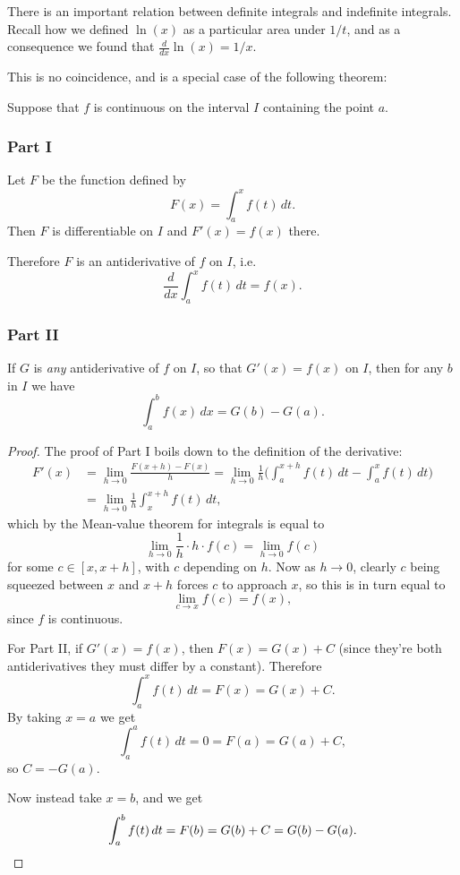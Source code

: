 
There is an important relation between definite integrals and indefinite integrals. Recall how we defined $\ln(x)$ as a particular area under $1/t$, and as a consequence we found that $\frac{d}{d x} \ln(x) = 1/x$.

This is no coincidence, and is a special case of the following theorem:

\begin{theorem}
	Suppose that $f$ is continuous on the interval $I$ containing the point $a$.

	\subsubsection*{Part I}

	Let $F$ be the function defined by
	\[
		F(x) = \int_a^x f(t) \, d t.
	\]
	Then $F$ is differentiable on $I$ and $F'(x) = f(x)$ there.

	Therefore $F$ is an antiderivative of $f$ on $I$, i.e.
	\[
		\frac{d}{d x} \int_a^x f(t) \, d t = f(x).
	\]

	\subsubsection*{Part II}

	If $G$ is \emph{any} antiderivative of $f$ on $I$, so that $G'(x) = f(x)$ on $I$, then for any $b$ in $I$ we have
	\[
		\int_a^b f(x) \, d x = G(b) - G(a).
	\]
\end{theorem}

\begin{proof}
	The proof of Part I boils down to the definition of the derivative:
	\begin{align*}
		F'(x) & = \lim_{h \to 0} \frac{F(x + h) - F(x)}{h} = \lim_{h \to 0} \frac{1}{h} \Big ( \int_a^{x + h} f(t) \, d t - \int_a^x f(t) \, d t \Big ) \\
		      & = \lim_{h \to 0} \frac{1}{h} \int_x^{x + h} f(t) \, d t,
	\end{align*}
	which by the Mean-value theorem for integrals is equal to
	\[
		\lim_{h \to 0} \frac{1}{h} \cdot h \cdot f(c) = \lim_{h \to 0} f(c)
	\]
	for some $c \in {[{x, x+h}]}$, with $c$ depending on $h$. Now as $h \to 0$, clearly $c$ being squeezed between $x$ and $x + h$ forces $c$ to approach $x$, so this is in turn equal to
	\[
		\lim_{c \to x} f(c) = f(x),
	\]
	since $f$ is continuous.

	For Part II, if $G'(x) = f(x)$, then $F(x) = G(x) + C$ (since they're both antiderivatives they must differ by a constant). Therefore
	\[
		\int_a^x f(t) \, d t = F(x) = G(x) + C.
	\]
	By taking $x = a$ we get
	\[
		\int_a^a f(t) \, d t = 0 = F(a) = G(a) + C,
	\]
	so $C = - G(a)$.

	Now instead take $x = b$, and we get
	\[
		\int_a^b f(t) \, d t = F(b) = G(b) + C = G(b) - G(a). \qedhere
	\]
\end{proof}

